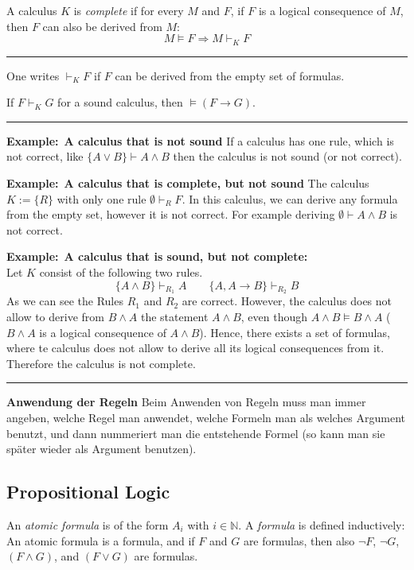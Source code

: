 \documentclass[a4paper]{extarticle}
\newcommand{\Ex}{\textbf{Example:}\ }
\newcommand{\N}{\mathbb{N}}
\newcommand{\derives}{\vdash}
\newcommand{\sep}{\vspace{5pt}\noindent\hrule\vspace{5pt}}
\begin{document}
\begin{multicols*}{2}
\Def[Completeness] A calculus $K$ is \emph{complete} if for every $M$ and $F$,
if $F$ is a logical consequence of $M$, then $F$ can also be derived from $M$:
\[
M\models F\Longrightarrow M\derives_K F
\]

\sep

One writes $\derives_K F$ if $F$ can be derived from the empty set of formulas.

\Lem If $F\derives_K G$ for a sound calculus, then $\models(F\rightarrow G)$.

\sep

\Ex \textbf{A calculus that is not sound} If a calculus has one rule, which is
not correct, like $\{A\lor B\}\derives A \land B$ then the calculus is not
sound (or not correct).

\Ex \textbf{A calculus that is complete, but not sound} The calculus $K:=\{R\}$
with only one rule $\emptyset \derives_R F$. In this calculus, we can derive any
formula from the empty set, however it is not correct. For example deriving
$\emptyset \derives A \land B$ is not correct.

\Ex \textbf{A calculus that is sound, but not complete:}\\
Let $K$ consist of the following two rules.
\[
\{A\land B\} \derives_{R_1} A \qquad \{A,A\rightarrow B\}\derives_{R_2} B
\]
As we can see the Rules $R_1$ and $R_2$ are correct. However, the calculus does
not allow to derive from $B\land A$ the statement $A\land B$, even though
$A\land B\models B\land A$ ($B\land A$ is a logical consequence of $A\land B$).
Hence, there exists a set of formulas, where te calculus does not allow to
derive all its logical consequences from it. Therefore the calculus is not
complete.

\sep

\textbf{Anwendung der Regeln} Beim Anwenden von Regeln muss man immer angeben,
welche Regel man anwendet, welche Formeln man als welches Argument benutzt, und
dann nummeriert man die entstehende Formel (so kann man sie später wieder als
Argument benutzen).

\subsection{Propositional Logic}

 An \emph{atomic formula} is of the form
$A_i$ with $i\in \N$. A \emph{formula} is defined inductively: An atomic formula
is a formula, and if $F$ and $G$ are formulas, then also $\lnot F$, $\lnot G$,
$(F\land G)$, and $(F\lor G)$ are formulas.


\end{multicols*}
\end{document}
